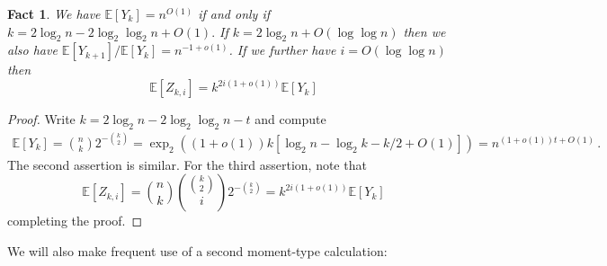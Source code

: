 \documentclass[11pt]{article}
\newtheorem{fact}[theorem]{Fact}
\theoremstyle{definition}
\theoremstyle{remark}
\newcommand{\E}{\mathbb{E}}
\begin{document}
\begin{fact}\label{fact:numerical}
    We have $\E [Y_k] = n^{O(1)}$ if and only if $k = 2\log_2 n - 2 \log_2\log_2 n + O(1).$  If $k = 2 \log_2 n + O(\log \log n)$ then we also have $\E [Y_{k+1}]/\E [Y_k] = n^{-1 + o(1)}$.  If we further have $i = O(\log \log n)$ then $$\E [Z_{k,i}] = k^{2i(1 + o(1))} \E [Y_k]$$
\end{fact}
\begin{proof}
    Write $k = 2\log_2 n - 2 \log_2 \log_2 n - t$ and compute \begin{align*}
        \E [Y_k] = \binom{n}{k} 2^{-\binom{k}{2}} = \exp_2\left((1 + o(1))k[\log_2 n - \log_2 k - k/2 + O(1)]\right) = n^{(1+o(1))t + O(1)}\,.
    \end{align*}
    The second assertion is similar.  For the third assertion, note that $$\E[ Z_{k,i}] = \binom{n}{k} \binom{\binom{k}{2}}{i}2^{-\binom{k}{2}} = k^{2i(1 + o(1))} \E [Y_k] $$
    completing the proof.
\end{proof}

We will also make frequent use of a second moment-type calculation:
\end{document}
